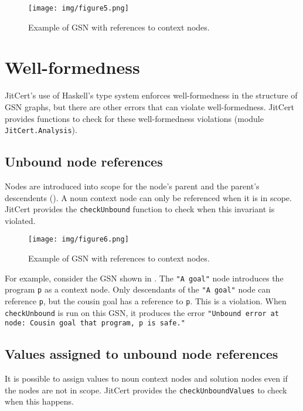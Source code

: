 \documentclass{article}
\newcommand{\jitcert}{JitCert\xspace}
\begin{document}
\begin{figure}
\centering
\texttt{[image: img/figure5.png]}
\caption{Example of GSN with references to context nodes.}
\label{fig:fig5}
\end{figure}


\section{Well-formedness}

\jitcert's use of Haskell's type system enforces well-formedness in the structure of GSN graphs, but there are other errors that can violate well-formedness. 
\jitcert provides functions to check for these well-formedness violations (module \texttt{JitCert.Analysis}).

\subsection{Unbound node references}
Nodes are introduced into scope for the node's parent and the parent's descendents (). 
A noun context node can only be referenced when it is in scope. 
\jitcert provides the \texttt{checkUnbound} function to check when this invariant is violated.


\begin{figure}
\centering
\texttt{[image: img/figure6.png]}
\caption{Example of GSN with references to context nodes.}
\label{fig:fig6}
\end{figure}


For example, consider the GSN shown in . 
The \texttt{"A goal"} node introduces the program \texttt{p} as a context node.
Only descendants of the \texttt{"A goal"} node can reference \texttt{p}, but the cousin goal has a reference to \texttt{p}.
This is a violation. 
When \texttt{checkUnbound} is run on this GSN, 
it produces the error \texttt{"Unbound error at node: Cousin goal that program, p is safe."}



\subsection{Values assigned to unbound node references}
It is possible to assign values to noun context nodes and solution nodes even if the nodes are not in scope. 
\jitcert provides the \texttt{checkUnboundValues} to check when this happens. 
\end{document}
